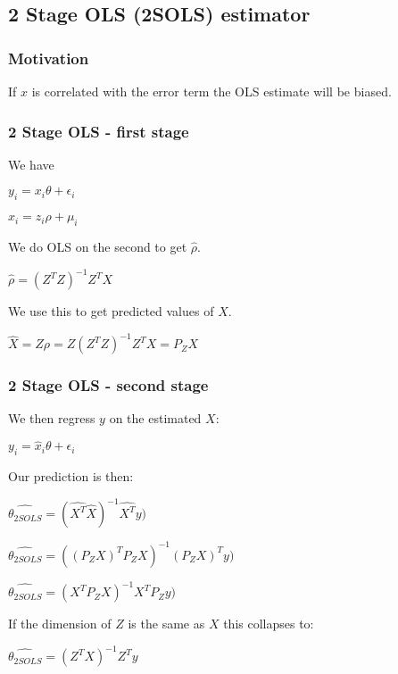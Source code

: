
\subsection{2 Stage OLS (2SOLS) estimator}

\subsubsection{Motivation}

If \(x\) is correlated with the error term the OLS estimate will be biased.

\subsubsection{2 Stage OLS - first stage}

We have 

\(y_i=x_i \theta + \epsilon_i \)

\(x_i=z_i \rho +\mu_i\)

We do OLS on the second to get \(\hat \rho \).

\(\hat \rho =(Z^TZ)^{-1}Z^TX\)

We use this to get predicted values of \(X\).

\(\hat X=Z\rho =Z(Z^TZ)^{-1}Z^TX = P_ZX\)

\subsubsection{2 Stage OLS - second stage}

We then regress \(y\) on the estimated \(X\):

\(y_i=\hat x_i\theta +\epsilon_i\)

Our prediction is then:

\(\hat {\theta_{2SOLS}} = (\hat {X^T}\hat X)^{-1}\hat {X^T}y)\)

\(\hat {\theta_{2SOLS}} = ((P_ZX)^TP_ZX)^{-1}(P_ZX)^Ty)\)

\(\hat {\theta_{2SOLS}} = (X^TP_ZX)^{-1}X^TP_Zy)\)

If the dimension of \(Z\) is the same as \(X\) this collapses to:

\(\hat {\theta_{2SOLS}} = (Z^TX)^{-1}Z^Ty\)

